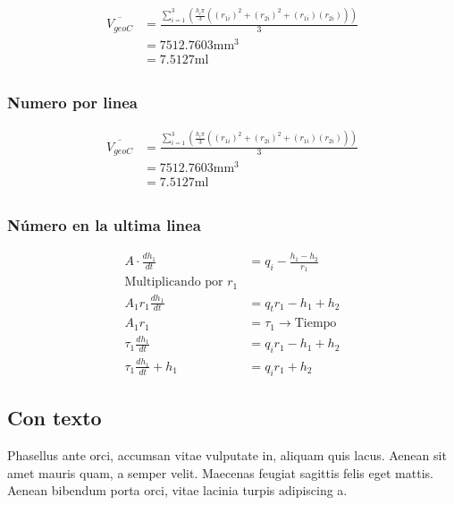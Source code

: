 \documentclass[colTwo]{NanouparIEEE}
\begin{document}
                \begin{align*}
                    \overline{V_{geoC}} &= \frac{\sum_{i=1}^{3} \left(\frac{h_i \pi}{3} \left( (r_{1i})^2 + (r_{2i})^2 + (r_{1i})(r_{2i}) \right) \right)}{3}  \\
                    & = 7512.7603 \mathrm{mm^3} \\
                    & = 7.5127 \mathrm{ml}\\
                \end{align*}

            \subsubsection{Numero por linea}

                \begin{align}
                    \overline{V_{geoC}} &= \frac{\sum_{i=1}^{3} \left(\frac{h_i \pi}{3} \left( (r_{1i})^2 + (r_{2i})^2 + (r_{1i})(r_{2i}) \right) \right)}{3}  \\
                    & = 7512.7603 \mathrm{mm^3} \\
                    & = 7.5127 \mathrm{ml}\\
                \end{align}

            \subsubsection{Número en la ultima linea}

                \begin{align}
                    A \cdot \frac{d h_1}{d t} &= q_i-\frac{h_1-h_2}{r_1} \nonumber\\ 
                    \text{Multiplicando por } r_1 \nonumber\\
                    A_1 r_1 \frac{d h_1}{d t} &= q_t r_1-h_1+h_2\nonumber \\
                    A_1 r_1 &= \tau_1 \xrightarrow{} \text{Tiempo}\nonumber \\
                    \tau_1 \frac{d h_1}{dt}&= q_i r_1 -h_1 + h_2 \nonumber \\
                    \tau_1 \frac{d h_1}{dt} + h_1 &= q_i r_1 + h_2 \label{Eq.Num}
                \end{align}

        \subsection{Con texto}
            Phasellus ante orci, accumsan vitae vulputate in, aliquam quis lacus. Aenean sit amet mauris quam, a semper velit. Maecenas feugiat sagittis felis eget mattis. Aenean bibendum porta orci, vitae lacinia turpis adipiscing a. 
            
\end{document}

